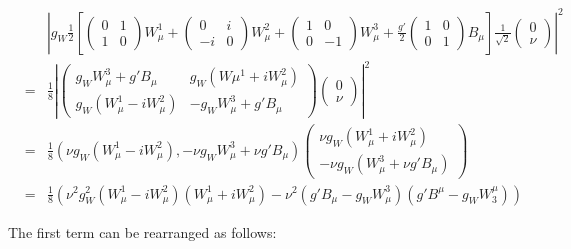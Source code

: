 \begin{eqnarray*}
  & &
  \left| g_W \frac{1}{2}\left[
  \left(
  \begin{array}{cc}
    0 & 1 \\
    1 & 0
  \end{array}
  \right)
  W_{\mu}^1 +
  \left(
  \begin{array}{cc}
    0  & i \\
    -i & 0
  \end{array}
  \right)
  W_{\mu}^2 +
  \left(
  \begin{array}{cc}
    1 & 0 \\
    0 & -1
  \end{array}
  \right)
  W_{\mu}^3
  + \frac{g'}{2}
  \left(
  \begin{array}{cc}
    1 & 0 \\
    0 & 1
  \end{array}
  \right)
  B_{\mu}
  \right]
  \frac{1}{\sqrt{2}}
  \left(
  \begin{array}{c}
    0 \\
    \nu
  \end{array}
  \right)
  \right|^2
  \\
  & = & \frac{1}{8}\left|
  \left(
  \begin{array}{cc}
    g_W W_{\mu}^3 + g'B_{\mu} & g_W\left(W{\mu}^1 + iW_{\mu}^2\right) \\
    g_W \left(W_{\mu}^1 - iW_{\mu}^2\right) & -g_W W_{\mu}^3 + g'B_{\mu}
  \end{array}
  \right)
  \left(
  \begin{array}{c}
    0 \\
    \nu
  \end{array}
  \right)
  \right|^2
  \\
  & = & \frac{1}{8}\left(\nu g_W\left(W_{\mu}^1 - iW_{\mu}^2\right) , -\nu g_W W_{\mu}^3 + \nu g'B_{\mu}\right)
  \left(
  \begin{array}{c}
    \nu g_W\left(W_{\mu}^1 + iW_{\mu}^2\right) \\
    -\nu g_W\left(W_{\mu}^3 + \nu g'B_{\mu}\right)
  \end{array}
  \right)
  \\
  & = &
  \frac{1}{8}\left( \nu^2g_W^2\left(W_{\mu}^1 - iW_{\mu}^2\right)\left(W_{\mu}^1 + iW_{\mu}^2\right) - \nu^2\left(g'B_{\mu} - g_W W_{\mu}^3\right)\left(g' B^{\mu} - g_W W^{\mu}_3\right)\right)
\end{eqnarray*}

The first term can be rearranged as follows:

